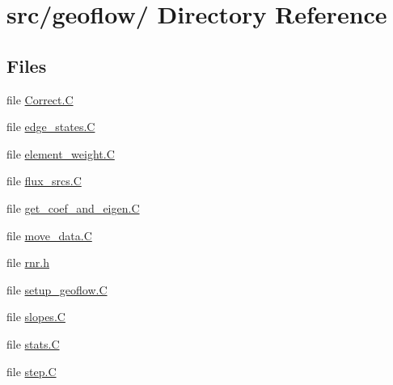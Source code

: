 \hypertarget{dir_000006}{
\section{src/geoflow/ Directory Reference}
\label{dir_000006}
}
\subsection*{Files}
\begin{CompactItemize}
\item 
file \hyperlink{Correct_8C}{Correct.C}
\item 
file \hyperlink{edge__states_8C}{edge\_\-states.C}
\item 
file \hyperlink{element__weight_8C}{element\_\-weight.C}
\item 
file \hyperlink{flux__srcs_8C}{flux\_\-srcs.C}
\item 
file \hyperlink{get__coef__and__eigen_8C}{get\_\-coef\_\-and\_\-eigen.C}
\item 
file \hyperlink{move__data_8C}{move\_\-data.C}
\item 
file \hyperlink{rnr_8h}{rnr.h}
\item 
file \hyperlink{setup__geoflow_8C}{setup\_\-geoflow.C}
\item 
file \hyperlink{slopes_8C}{slopes.C}
\item 
file \hyperlink{stats_8C}{stats.C}
\item 
file \hyperlink{step_8C}{step.C}
\end{CompactItemize}
